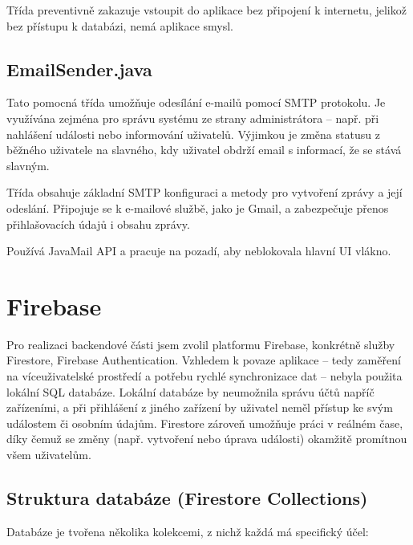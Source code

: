 Třída preventivně zakazuje vstoupit do aplikace bez připojení k internetu, jelikož bez přístupu k databázi, nemá aplikace smysl.




\subsection*{EmailSender.java}

Tato pomocná třída umožňuje odesílání e-mailů pomocí SMTP protokolu. Je využívána zejména pro správu systému ze strany administrátora – např. při nahlášení události nebo informování uživatelů. Výjimkou je změna statusu z běžného uživatele na slavného, kdy uživatel obdrží email s informací, že se stává slavným.

Třída obsahuje základní SMTP konfiguraci a metody pro vytvoření zprávy a její odeslání. Připojuje se k e-mailové službě, jako je Gmail, a zabezpečuje přenos přihlašovacích údajů i obsahu zprávy.

Používá JavaMail API a pracuje na pozadí, aby neblokovala hlavní UI vlákno.

\cite{JavaDocs} \cite{MapTapStackoverflow}




\section{Firebase}

Pro realizaci backendové části jsem zvolil platformu Firebase, konkrétně služby Firestore, Firebase Authentication. Vzhledem k povaze aplikace – tedy zaměření na víceuživatelské prostředí a potřebu rychlé synchronizace dat – nebyla použita lokální SQL databáze. Lokální databáze by neumožnila správu účtů napříč zařízeními, a při přihlášení z jiného zařízení by uživatel neměl přístup ke svým událostem či osobním údajům. Firestore zároveň umožňuje práci v reálném čase, díky čemuž se změny (např. vytvoření nebo úprava události) okamžitě promítnou všem uživatelům.

\subsection{Struktura databáze (Firestore Collections)}

Databáze je tvořena několika kolekcemi, z nichž každá má specifický účel:

